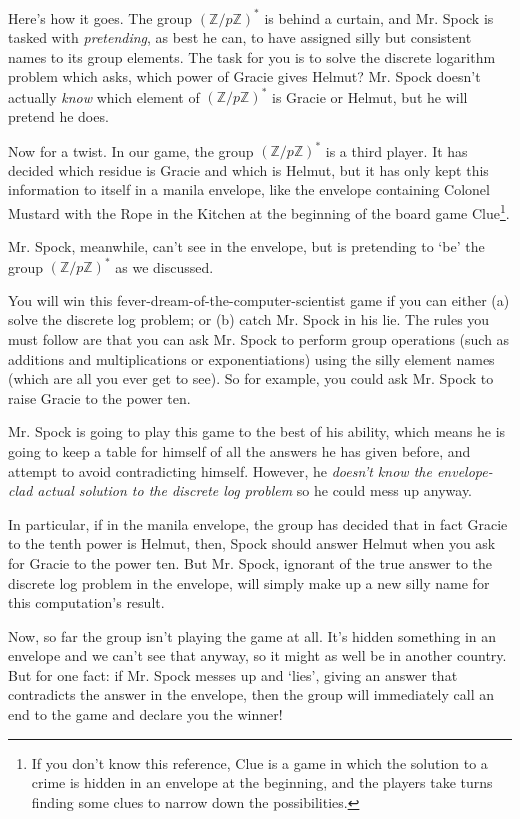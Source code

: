 \documentclass{article}
\theoremstyle{plain}
\theoremstyle{definition}
\theoremstyle{remark}
\numberwithin{theorem}{section}
\newcommand{\ZZ}{\mathbb{Z}}
\begin{document}
Here's how it goes.  The group $(\ZZ/p\ZZ)^*$ is behind a curtain, and Mr. Spock is tasked with \emph{pretending}, as best he can, to have assigned silly but consistent names to its group elements.  The task for you is to solve the discrete logarithm problem which asks, which power of Gracie gives Helmut?  Mr. Spock doesn't actually \emph{know} which element of $(\ZZ/p\ZZ)^*$ is Gracie or Helmut, but he will pretend he does.  

Now for a twist.  In our game, the group $(\ZZ/p\ZZ)^*$ is a third player.  It has decided which residue is Gracie and which is Helmut, but it has only kept this information to itself in a manila envelope, like the envelope containing Colonel Mustard with the Rope in the Kitchen at the beginning of the board game Clue\footnote{If you don't know this reference, Clue is a game in which the solution to a crime is hidden in an envelope at the beginning, and the players take turns finding some clues to narrow down the possibilities.}.

Mr. Spock, meanwhile, can't see in the envelope, but is pretending to `be' the group $(\ZZ/p\ZZ)^*$ as we discussed.

You will win this fever-dream-of-the-computer-scientist game if you can either (a) solve the discrete log problem; or (b) catch Mr. Spock in his lie.  The rules you must follow are that you can ask Mr. Spock to perform group operations (such as additions and multiplications or exponentiations) using the silly element names (which are all you ever get to see).  So for example, you could ask Mr. Spock to raise Gracie to the power ten.

Mr. Spock is going to play this game to the best of his ability, which means he is going to keep a table for himself of all the answers he has given before, and attempt to avoid contradicting himself.  However, he \emph{doesn't know the envelope-clad actual solution to the discrete log problem} so he could mess up anyway.

In particular, if in the manila envelope, the group has decided that in fact Gracie to the tenth power is Helmut, then, Spock should answer Helmut when you ask for Gracie to the power ten.  But Mr. Spock, ignorant of the true answer to the discrete log problem in the envelope, will simply make up a new silly name for this computation's result.

Now, so far the group isn't playing the game at all.  It's hidden something in an envelope and we can't see that anyway, so it might as well be in another country.  But for one fact:  if Mr. Spock messes up and `lies', giving an answer that contradicts the answer in the envelope, then the group will immediately call an end to the game and declare you the winner!
\end{document}
